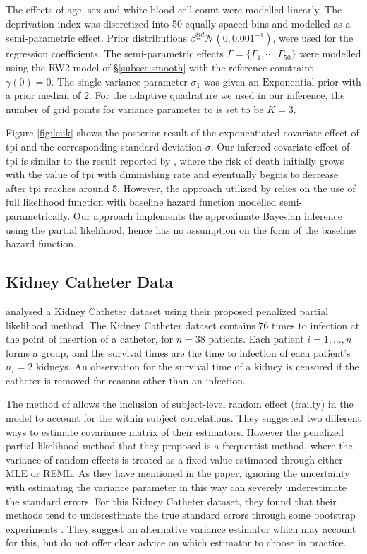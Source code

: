 \documentclass[ba]{imsart}
\begin{document}
The effects of age, sex and white blood cell count were modelled linearly. The deprivation index was discretized into 50 equally spaced bins and modelled as a semi-parametric effect. Prior distributions $\beta \stackrel{iid}{\sim} \mathcal{N}(0, 0.001^{-1})$, were used for the regression coefficients. The semi-parametric effects $\Gamma = \{\Gamma_{1}, \cdots, \Gamma_{50}\}$ were modelled using the RW2 model of \S\ref{subsec:smooth} with the reference constraint $\gamma(0) = 0$. The single variance parameter $\sigma_{1}$ was given an $\text{Exponential}$ prior with a prior median of 2. For the adaptive quadrature we used in our inference, the number of grid points for variance parameter to is set to be $K = 3$.

Figure \ref{fig:leuk} shows the posterior result of the exponentiated covariate effect of tpi and the corresponding standard deviation $\sigma$. Our inferred covariate effect of tpi is similar to the result reported by \cite{inlacoxph}, where the risk of death initially grows with the value of tpi with diminishing rate and eventually begins to decrease after tpi reaches around 5. However, the approach utilized by \cite{inlacoxph} relies on the use of full likelihood function with baseline hazard function modelled semi-parametrically. Our approach implements the approximate Bayesian inference using the partial likelihood, hence has no assumption on the form of the baseline hazard function. 


\subsection{Kidney Catheter Data}\label{subsec:kidney}

\cite{freqPL} analysed a Kidney Catheter dataset using their proposed penalized partial likelihood method. The Kidney Catheter dataset contains 76 times to infection at the point of insertion of a catheter, for $n = 38$ patients. Each patient $i=1,\ldots,n$ forms a group, and the survival times are the time to infection of each patient's $n_{i} = 2$ kidneys. An observation for the survival time of a kidney is censored if the catheter is removed for reasons other than an infection. 

The method of \cite{freqPL} allows the inclusion of subject-level random effect (frailty) in the model to account for the within subject correlations. They suggested two different ways to estimate covariance matrix of their estimators. However the penalized partial likelihood method that they proposed is a frequentist method, where the variance of random effects is treated as a fixed value estimated through either MLE or REML. As they have mentioned in the paper, ignoring the uncertainty with estimating the variance parameter in this way can severely underestimate the standard errors. For this Kidney Catheter dataset, they found that their methods tend to underestimate the true standard errors through some bootstrap experiments \citep{freqPL}. They suggest an alternative variance estimator which may account for this, but do not offer clear advice on which estimator to choose in practice.
\end{document}
